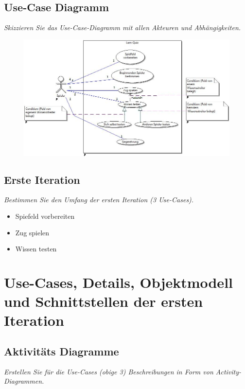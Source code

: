 \documentclass{report}
\begin{document}
\subsection{Use-Case Diagramm}
\textit{Skizzieren Sie das Use-Case-Diagramm mit allen Akteuren und Abh\"angigkeiten.}
\begin{figure}[H]
	\includegraphics[width=\textwidth]{Diagramme/UseCaseDiagram.jpg}
	\centering
\end{figure}

\subsection{Erste Iteration}
\textit{Bestimmen Sie den Umfang der ersten Iteration (3 Use-Cases).}
\begin{itemize}
   \item Spiefeld vorbereiten
   \item Zug spielen
   \item Wissen testen
\end{itemize}

\section{Use-Cases, Details, Objektmodell und Schnittstellen der ersten Iteration}

\subsection{Aktivitäts Diagramme}
\textit{Erstellen Sie f\"ur die Use-Cases (obige 3) Beschreibungen in Form von Activity-Diagrammen.}
\end{document}

